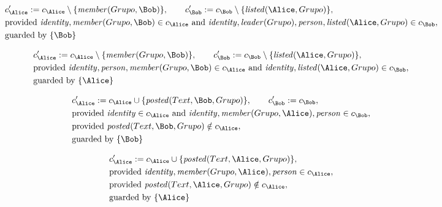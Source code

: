 \begin{align*}
&
c'_
{
\Alice
}
 := 
c_
{
\Alice
}
 \setminus 
\{
\mathit{\detokenize{
member
}}
(
Grupo
,
\Bob
)
\}
, \qquad 
c'_
{
\Bob
}
 := 
c_
{
\Bob
}
 \setminus 
\{
\mathit{\detokenize{
listed
}}
(
\Alice
,
Grupo
)
\}
,\\
&
\text{provided } 
\mathit{\detokenize{
identity
}}
,
\mathit{\detokenize{
member
}}
(
Grupo
,
\Bob
)
 \in c_
{
\Alice
}
 \text{ and } 
\mathit{\detokenize{
identity
}}
,
\mathit{\detokenize{
leader
}}
(
Grupo
)
,
\mathit{\detokenize{
person
}}
,
\mathit{\detokenize{
listed
}}
(
\Alice
,
Grupo
)
 \in c_
{
\Bob
}
,\\
&
\text{guarded by } \{
\Bob
\}
\end{align*}

\begin{align*}
&
c'_
{
\Alice
}
 := 
c_
{
\Alice
}
 \setminus 
\{
\mathit{\detokenize{
member
}}
(
Grupo
,
\Bob
)
\}
, \qquad 
c'_
{
\Bob
}
 := 
c_
{
\Bob
}
 \setminus 
\{
\mathit{\detokenize{
listed
}}
(
\Alice
,
Grupo
)
\}
,\\
&
\text{provided } 
\mathit{\detokenize{
identity
}}
,
\mathit{\detokenize{
person
}}
,
\mathit{\detokenize{
member
}}
(
Grupo
,
\Bob
)
 \in c_
{
\Alice
}
 \text{ and } 
\mathit{\detokenize{
identity
}}
,
\mathit{\detokenize{
listed
}}
(
\Alice
,
Grupo
)
 \in c_
{
\Bob
}
,\\
&
\text{guarded by } \{
\Alice
\}
\end{align*}

\begin{align*}
&
c'_
{
\Alice
}
 := 
c_
{
\Alice
}
 \cup 
\{
\mathit{\detokenize{
posted
}}
(
Text
,
\Bob
,
Grupo
)
\}
, \qquad 
c'_
{
\Bob
}
 := 
c_
{
\Bob
}
,\\
&
\text{provided } 
\mathit{\detokenize{
identity
}}
 \in c_
{
\Alice
}
 \text{ and } 
\mathit{\detokenize{
identity
}}
,
\mathit{\detokenize{
member
}}
(
Grupo
,
\Alice
)
,
\mathit{\detokenize{
person
}}
 \in c_
{
\Bob
}
,\\
&
\text{provided } 
\mathit{\detokenize{
posted
}}
(
Text
,
\Bob
,
Grupo
)
 \notin c_
{
\Alice
}
,\\
&
\text{guarded by } \{
\Bob
\}
\end{align*}

\begin{align*}
&
c'_
{
\Alice
}
 := 
c_
{
\Alice
}
 \cup 
\{
\mathit{\detokenize{
posted
}}
(
Text
,
\Alice
,
Grupo
)
\}
,\\
&
\text{provided } 
\mathit{\detokenize{
identity
}}
,
\mathit{\detokenize{
member
}}
(
Grupo
,
\Alice
)
,
\mathit{\detokenize{
person
}}
 \in c_
{
\Alice
}
,\\
&
\text{provided } 
\mathit{\detokenize{
posted
}}
(
Text
,
\Alice
,
Grupo
)
 \notin c_
{
\Alice
}
,\\
&
\text{guarded by } \{
\Alice
\}
\end{align*}
